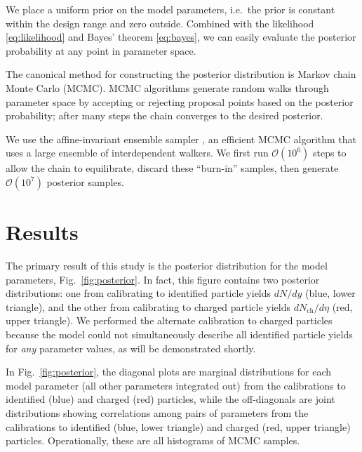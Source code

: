 \documentclass[aps,prc,reprint,amsmath,nofootinbib,superscriptaddress]{revtex4-1}
\newcommand{\nch}{N_\text{ch}}
\newcommand{\order}[1]{$\mathcal O(10^{#1})$}
\begin{document}
We place a uniform prior on the model parameters, i.e.\ the prior is constant within the design range and zero outside.
Combined with the likelihood \eqref{eq:likelihood} and Bayes' theorem \eqref{eq:bayes}, we can easily evaluate the posterior probability at any point in parameter space.

The canonical method for constructing the posterior distribution is Markov chain Monte Carlo (MCMC).
MCMC algorithms generate random walks through parameter space by accepting or rejecting proposal points based on the posterior probability; after many steps the chain converges to the desired posterior.

We use the affine-invariant ensemble sampler \cite{Goodman:2010en,FM:2013mc}, an efficient MCMC algorithm that uses a large ensemble of interdependent walkers.
We first run \order 6 steps to allow the chain to equilibrate, discard these ``burn-in'' samples, then generate \order 7 posterior samples.


\section{\label{sec:results}Results}


The primary result of this study is the posterior distribution for the model parameters, Fig.~\ref{fig:posterior}.
In fact, this figure contains two posterior distributions:
one from calibrating to identified particle yields $dN/dy$ (blue, lower triangle),
and the other from calibrating to charged particle yields $d\nch/d\eta$ (red, upper triangle).
We performed the alternate calibration to charged particles because the model could not simultaneously describe all identified particle yields for \emph{any} parameter values, as will be demonstrated shortly.

In Fig.~\ref{fig:posterior}, the diagonal plots are marginal distributions for each model parameter (all other parameters integrated out) from the calibrations to identified (blue) and charged (red) particles, while the off-diagonals are joint distributions showing correlations among pairs of parameters from the calibrations to identified (blue, lower triangle) and charged (red, upper triangle) particles.
Operationally, these are all histograms of MCMC samples.
\end{document}
